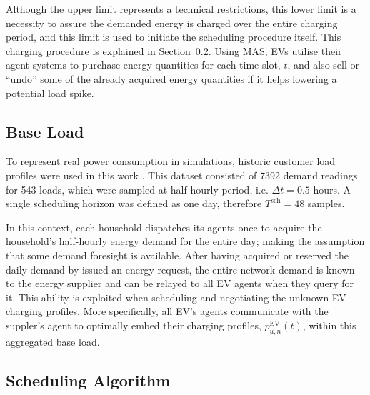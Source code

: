 

Although the upper limit represents a technical restrictions, this lower limit is a necessity to assure the demanded energy is charged over the entire charging period, and this limit is used to initiate the scheduling procedure itself.
This charging procedure is explained in Section~\ref{ch3:subsec:scheduling-algorithm}.
Using MAS, EVs utilise their agent systems to purchase energy quantities for each time-slot, $t$, and also sell or ``undo'' some of the already acquired energy quantities if it helps lowering a potential load spike.

\subsection{Base Load}


To represent real power consumption in simulations, historic customer load profiles were used in this work \cite{IrishData2002}.
This dataset consisted of 7392 demand readings for 543 loads, which were sampled at half-hourly period, i.e. $\Delta t = 0.5$ hours.
A single scheduling horizon was defined as one day, therefore $T^\text{sch}=48$ samples.

In this context, each household dispatches its agents once to acquire the household's half-hourly energy demand for the entire day; making the assumption that some demand foresight is available.
After having acquired or reserved the daily demand by issued an energy request, the entire network demand is known to the energy supplier and can be relayed to all EV agents when they query for it.
This ability is exploited when scheduling and negotiating the unknown EV charging profiles.
More specifically, all EV's agents communicate with the suppler's agent to optimally embed their charging profiles, $p^\text{EV}_{u,n}(t)$, within this aggregated base load.

\subsection{Scheduling Algorithm}
\label{ch3:subsec:scheduling-algorithm}

